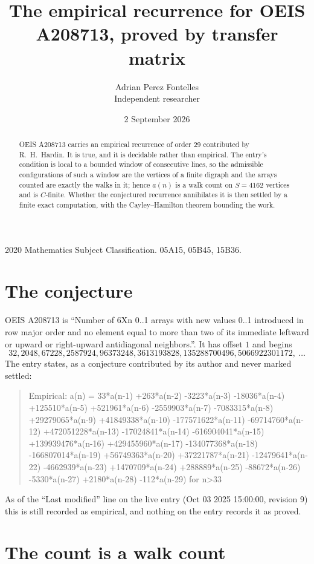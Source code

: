 \documentclass[11pt,a4paper]{article}
\title{The empirical recurrence for OEIS A208713, proved by transfer matrix}
\author{Adrian Perez Fontelles\\ \small Independent researcher}
\date{2 September 2026}
\theoremstyle{plain}
\theoremstyle{definition}
\begin{document}
\maketitle

\begin{abstract}
OEIS A208713 carries an empirical recurrence of order $29$ contributed by R.~H.~Hardin. It is
true, and it is decidable rather than empirical. The entry's condition is local to a bounded window of consecutive lines, so
the admissible configurations of such a window are the vertices of a finite digraph and the
arrays counted are exactly the walks in it; hence $a(n)$ is a walk count on $S=4162$ vertices
and is $C$-finite. Whether the conjectured recurrence annihilates it is then settled by a
finite exact computation, with the Cayley--Hamilton theorem bounding the work.
\end{abstract}

\noindent\small 2020 Mathematics Subject Classification. 05A15, 05B45, 15B36.\normalsize

\section{The conjecture}

OEIS A208713 is ``Number of 6Xn 0..1 arrays with new values 0..1 introduced in row major order and no element equal to more than two of its immediate leftward or upward or right-upward antidiagonal neighbors.''. It has offset $1$ and begins
\[
32, 2048, 67228, 2587924, 96373248, 3613193828, 135288700496, 5066922301172,\ \dots
\]
The entry states, as a conjecture contributed by its author and never marked settled:
\begin{quote}
Empirical: a(n) = 33*a(n-1) +263*a(n-2) -3223*a(n-3) -18036*a(n-4) +125510*a(n-5) +521961*a(n-6) -2559903*a(n-7) -7083315*a(n-8) +29279065*a(n-9) +41849338*a(n-10) -177571622*a(n-11) -69714760*a(n-12) +472051228*a(n-13) -17024841*a(n-14) -616904041*a(n-15) +139939476*a(n-16) +429455960*a(n-17) -134077368*a(n-18) -166807014*a(n-19) +56749363*a(n-20) +37221787*a(n-21) -12479641*a(n-22) -4662939*a(n-23) +1470709*a(n-24) +288889*a(n-25) -88672*a(n-26) -5330*a(n-27) +2180*a(n-28) -112*a(n-29) for n>33
\end{quote}
As of the ``Last modified'' line on the live entry (Oct 03 2025 15:00:00, revision 9) this is still
recorded as empirical, and nothing on the entry records it as proved.

\section{The count is a walk count}
\end{document}
